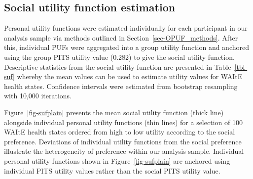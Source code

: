 \documentclass[
  number,
  preprint]{elsarticle}
\begin{document}
\newpage

\subsection{Social utility function
estimation}\label{social-utility-function-estimation}

Personal utility functions were estimated individually for each
participant in our analysis sample via methods outlined in
Section~\ref{sec-OPUF_methods}. After this, individual PUFs were
aggregated into a group utility function and anchored using the group
PITS utility value (0.282) to give the social utility function.
Descriptive statistics from the social utility function are presented in
Table~\ref{tbl-suf} whereby the mean values can be used to estimate
utility values for WAItE health states. Confidence intervals were
estimated from bootstrap resampling with 10,000 iterations.

Figure~\ref{fig-sufplain} presents the mean social utility function
(thick line) alongside individual personal utility functions (thin
lines) for a selection of 100 WAItE health states ordered from high to
low utility according to the social preference. Deviations of individual
utility functions from the social preference illustrate the
heterogeneity of preference within our analysis sample. Individual
personal utility functions shown in Figure~\ref{fig-sufplain} are
anchored using individual PITS utility values rather than the social
PITS utility value.
\end{document}
